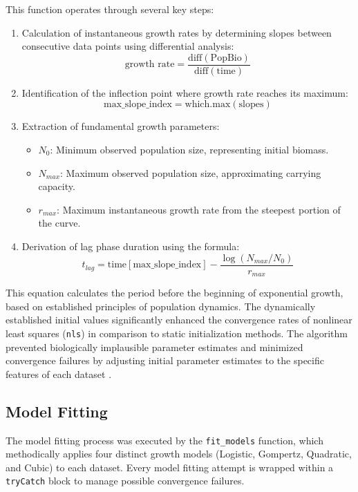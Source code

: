 \documentclass[11pt]{article}
\begin{document}
This function operates through several key steps:
\begin{enumerate}
    \item Calculation of instantaneous growth rates by determining slopes between consecutive data points using differential analysis:
    \begin{equation}
    \text{growth rate} = \frac{\text{diff}(\text{PopBio})}{\text{diff}(\text{time})}
    \end{equation}
    \item Identification of the inflection point where growth rate reaches its maximum:
    \begin{equation}
    \text{max\_slope\_index} = \text{which.max} (\text{slopes})
    \end{equation}
    \item Extraction of fundamental growth parameters:
    \begin{itemize}
        \item $N_0$: Minimum observed population size, representing initial biomass.
        \item $N_{max}$: Maximum observed population size, approximating carrying capacity.
        \item $r_{max}$: Maximum instantaneous growth rate from the steepest portion of the curve.
    \end{itemize}
    \item Derivation of lag phase duration using the formula:
    \begin{equation}
    t_{lag} = \text{time}[\text{max\_slope\_index}] - \frac{\log(N_{max} / N_0)}{r_{max}}
    \end{equation}
\end{enumerate}
This equation calculates the period before the beginning of exponential growth, based on established principles of population dynamics. The dynamically established initial values significantly enhanced the convergence rates of nonlinear least squares (\texttt{nls}) in comparison to static initialization methods. The algorithm prevented biologically implausible parameter estimates and minimized convergence failures by adjusting initial parameter estimates to the specific features of each dataset \citep{LeNovere2006}.

\subsection{Model Fitting}
The model fitting process was executed by the \texttt{fit\_models} function, which methodically applies four distinct growth models (Logistic, Gompertz, Quadratic, and Cubic) to each dataset. Every model fitting attempt is wrapped within a \texttt{tryCatch} block to manage possible convergence failures. 
\end{document}

